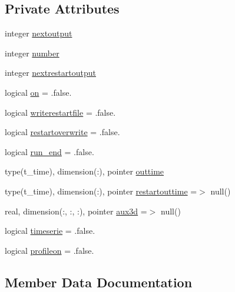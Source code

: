 \subsection*{Private Attributes}
\begin{DoxyCompactItemize}
\item 
integer \mbox{\hyperlink{structmoduleturbulence_1_1t__output_aa0125a3cdf89161bbbeeb7114c484eca}{nextoutput}}
\item 
integer \mbox{\hyperlink{structmoduleturbulence_1_1t__output_a1e8f08486aeffa47424bd05755ad333e}{number}}
\item 
integer \mbox{\hyperlink{structmoduleturbulence_1_1t__output_a234bab52792b75cbc33568f24fbf07a8}{nextrestartoutput}}
\item 
logical \mbox{\hyperlink{structmoduleturbulence_1_1t__output_acee24726cb11fd6a4210806521b25d0f}{on}} = .false.
\item 
logical \mbox{\hyperlink{structmoduleturbulence_1_1t__output_a2592d970ed36fec5a7c576ead3ecbcdc}{writerestartfile}} = .false.
\item 
logical \mbox{\hyperlink{structmoduleturbulence_1_1t__output_a6272ff49565116fefcf85690e8b6e290}{restartoverwrite}} = .false.
\item 
logical \mbox{\hyperlink{structmoduleturbulence_1_1t__output_a0d784048c0736c93cb91d3f45e417cb2}{run\+\_\+end}} = .false.
\item 
type(t\+\_\+time), dimension(\+:), pointer \mbox{\hyperlink{structmoduleturbulence_1_1t__output_af5dfaf5a56920d0133562ffbf2545490}{outtime}}
\item 
type(t\+\_\+time), dimension(\+:), pointer \mbox{\hyperlink{structmoduleturbulence_1_1t__output_a37e968e1027b2debde9bb8cb2e7f6e3e}{restartouttime}} =$>$ null()
\item 
real, dimension(\+:, \+:, \+:), pointer \mbox{\hyperlink{structmoduleturbulence_1_1t__output_a5890ff7e37688b13cfa7a51b3f4b4c3a}{aux3d}} =$>$ null()
\item 
logical \mbox{\hyperlink{structmoduleturbulence_1_1t__output_aa4d4131d3628d2e3a9cb9c0526fbbf06}{timeserie}} = .false.
\item 
logical \mbox{\hyperlink{structmoduleturbulence_1_1t__output_a3e7ac4d3e24ea95836148a61b20deebc}{profileon}} = .false.
\end{DoxyCompactItemize}


\subsection{Member Data Documentation}
\mbox{\label{structmoduleturbulence_1_1t__output_a5890ff7e37688b13cfa7a51b3f4b4c3a}} 
